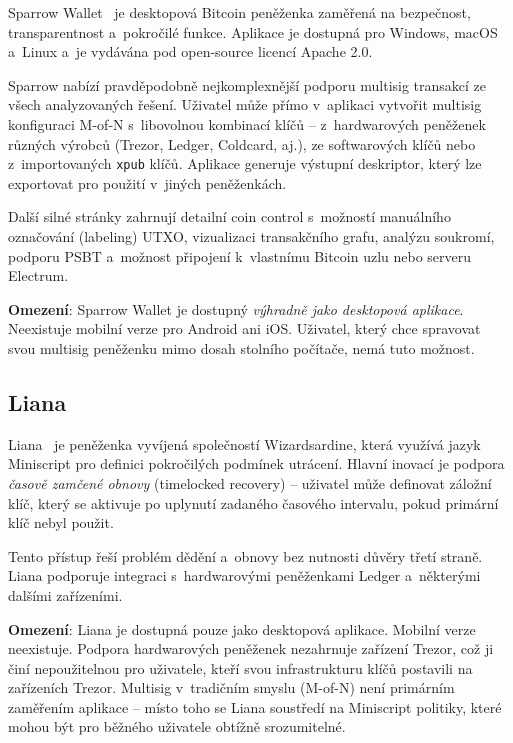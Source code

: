 Sparrow Wallet~\citep{SparrowWallet} je desktopová Bitcoin peněženka zaměřená
na bezpečnost, transparentnost a~pokročilé funkce. Aplikace je dostupná pro
Windows, macOS a~Linux a~je vydávána pod open-source licencí Apache 2.0.

Sparrow nabízí pravděpodobně nejkomplexnější podporu multisig transakcí ze
všech analyzovaných řešení. Uživatel může přímo v~aplikaci vytvořit multisig
konfiguraci M-of-N s~libovolnou kombinací klíčů -- z~hardwarových peněženek
různých výrobců (Trezor, Ledger, Coldcard, aj.), ze softwarových klíčů nebo
z~importovaných \texttt{xpub} klíčů. Aplikace generuje výstupní deskriptor,
který lze exportovat pro použití v~jiných peněženkách.

Další silné stránky zahrnují detailní coin control s~možností manuálního
označování (labeling) UTXO, vizualizaci transakčního grafu, analýzu soukromí,
podporu PSBT a~možnost připojení k~vlastnímu Bitcoin uzlu nebo serveru Electrum.

\textbf{Omezení}: Sparrow Wallet je dostupný \emph{výhradně jako desktopová
aplikace}. Neexistuje mobilní verze pro Android ani iOS. Uživatel, který chce
spravovat svou multisig peněženku mimo dosah stolního počítače, nemá tuto
možnost.

\subsection{Liana}
\label{sec:liana}

Liana~\citep{LianaWallet} je peněženka vyvíjená společností Wizardsardine,
která využívá jazyk Miniscript pro definici pokročilých podmínek utrácení.
Hlavní inovací je podpora \emph{časově zamčené obnovy} (timelocked recovery) --
uživatel může definovat záložní klíč, který se aktivuje po uplynutí zadaného
časového intervalu, pokud primární klíč nebyl použit.

Tento přístup řeší problém dědění a~obnovy bez nutnosti důvěry třetí straně.
Liana podporuje integraci s~hardwarovými peněženkami Ledger a~některými dalšími
zařízeními.

\textbf{Omezení}: Liana je dostupná pouze jako desktopová aplikace. Mobilní
verze neexistuje. Podpora hardwarových peněženek nezahrnuje zařízení Trezor,
což ji činí nepoužitelnou pro uživatele, kteří svou infrastrukturu klíčů
postavili na zařízeních Trezor. Multisig v~tradičním smyslu (M-of-N) není
primárním zaměřením aplikace -- místo toho se Liana soustředí na Miniscript
politiky, které mohou být pro běžného uživatele obtížně srozumitelné.

